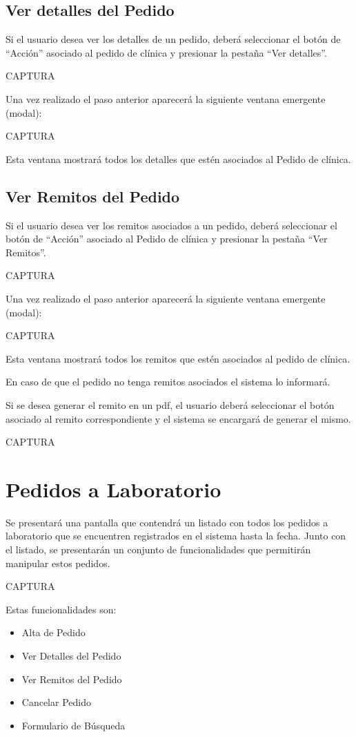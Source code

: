 \documentclass[letterpaper,10pt,spanish]{sphinxmanual}
\begin{document}
\subsection{Ver detalles del Pedido}
\label{pedidosclinica:ver-detalles-del-pedido}
Si el usuario desea ver los detalles de un pedido, deberá seleccionar el botón de “Acción” asociado al pedido de clínica y presionar la pestaña “Ver detalles”.

CAPTURA

Una vez realizado el paso anterior aparecerá la siguiente ventana emergente (modal):

CAPTURA

Esta ventana mostrará todos los detalles que estén asociados al Pedido de clínica.


\subsection{Ver Remitos del Pedido}
\label{pedidosclinica:ver-remitos-del-pedido}
Si el usuario desea ver los remitos asociados a un pedido, deberá seleccionar el botón de “Acción” asociado al Pedido de clínica y presionar la pestaña “Ver Remitos”.

CAPTURA

Una vez realizado el paso anterior aparecerá la siguiente ventana emergente (modal):

CAPTURA

Esta ventana mostrará todos los remitos  que estén asociados al pedido de clínica.

En caso de que el pedido no tenga remitos asociados el sistema lo informará.

Si se desea generar el remito en un pdf, el usuario deberá seleccionar el botón asociado al remito correspondiente y el sistema se encargará de generar el mismo.

CAPTURA


\section{Pedidos a Laboratorio}
\label{pedidosalab:pedidos-a-laboratorio}\label{pedidosalab::doc}
Se presentará una pantalla que contendrá un listado con todos los pedidos a laboratorio que se encuentren registrados en el sistema hasta la fecha. Junto con el listado, se presentarán un conjunto de funcionalidades que permitirán manipular estos pedidos.

CAPTURA

Estas funcionalidades son:
\begin{itemize}
\item {} 
Alta de Pedido

\item {} 
Ver Detalles del Pedido

\item {} 
Ver Remitos del Pedido

\item {} 
Cancelar Pedido

\item {} 
Formulario de Búsqueda

\end{itemize}
\end{document}
